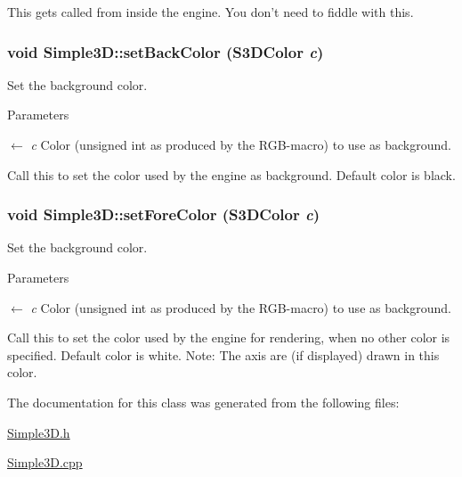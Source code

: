 This gets called from inside the engine. You don't need to fiddle with this. \hypertarget{class_simple3_d_a2e1f61afda5ab9cb2a1abd05a856c5d7}{
\subsubsection[{setBackColor}]{\setlength{\rightskip}{0pt plus 5cm}void Simple3D::setBackColor ({\bf S3DColor} {\em c})}}
\label{class_simple3_d_a2e1f61afda5ab9cb2a1abd05a856c5d7}


Set the background color. 


\begin{DoxyParams}{Parameters}
\item[\mbox{$\leftarrow$} {\em c}]Color (unsigned int as produced by the RGB-\/macro) to use as background.\end{DoxyParams}
Call this to set the color used by the engine as background. Default color is black. \hypertarget{class_simple3_d_a9dd0eb5a220c4490656dc3dd5cc79857}{
\subsubsection[{setForeColor}]{\setlength{\rightskip}{0pt plus 5cm}void Simple3D::setForeColor ({\bf S3DColor} {\em c})}}
\label{class_simple3_d_a9dd0eb5a220c4490656dc3dd5cc79857}


Set the background color. 


\begin{DoxyParams}{Parameters}
\item[\mbox{$\leftarrow$} {\em c}]Color (unsigned int as produced by the RGB-\/macro) to use as background.\end{DoxyParams}
Call this to set the color used by the engine for rendering, when no other color is specified. Default color is white. Note: The axis are (if displayed) drawn in this color. 

The documentation for this class was generated from the following files:\begin{DoxyCompactItemize}
\item 
\hyperlink{_simple3_d_8h}{Simple3D.h}\item 
\hyperlink{_simple3_d_8cpp}{Simple3D.cpp}\end{DoxyCompactItemize}
